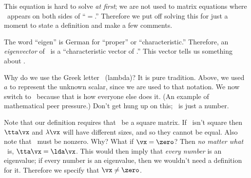 %
%

This equation is hard to solve \textit{at first}; we are not used to matrix equations where \vx\ appears on both sides of ``$=$.'' Therefore we put off solving this for just a moment to state a definition and make a few comments.

\smallskip


\smallskip

The word ``eigen'' is German for ``proper'' or ``characteristic.'' Therefore, an \textit{eigenvector} of \tta\ is a ``characteristic vector of \tta.'' This vector tells us something about \tta. 

Why do we use the Greek letter \lda\ (lambda)? It is pure tradition. Above, we used $a$ to represent the unknown scalar, since we are used to that notation. We now switch to \lda\ because that is how everyone else does it. (An example of mathematical peer pressure.) %
 Don't get hung up on this; \lda\ is just a number.

Note that our definition requires that \tta\ be a square matrix.
If \tta\ isn't square then $\tta\vx$ and $\lambda\vx$ will have different sizes, and so they cannot be equal. Also note that \vx\ must be nonzero. Why? What if $\vx = \zero$? Then \textit{no matter what} \lda\ is, $\tta\vx = \lda\vx$. This would then imply that \textit{every number} is an eigenvalue; if every number is an eigenvalue, then we wouldn't need a definition for 
it.  Therefore we specify that $\vx\neq \zero$.

